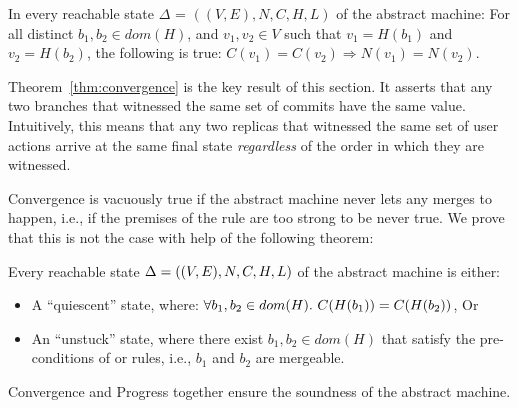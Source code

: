 \begin{theorem}[{\bf Convergence}]
  \label{thm:convergence}
  In every reachable state $\Delta$ = $((V,E),N,C,H,L)$ of the abstract
  machine: For all distinct $b_1, b_2 \in dom(H)$, and $v_1, v_2 \in V$
  such that $v_1 = H(b_1)$ and $v_2 = H(b_2)$, the following is true:
  $C(v_1) = C(v_2) \Rightarrow N(v_1) = N(v_2)$.
\end{theorem}

Theorem~\ref{thm:convergence} is the key result of this section. It
asserts that any two branches that witnessed the same set of commits
have the same value. Intuitively, this means that any two replicas
that witnessed the same set of user actions arrive at the same final
state \emph{regardless} of the order in which they are witnessed. 

Convergence is vacuously true if the abstract machine never lets any
merges to happen, i.e., if the premises of the  rule
are too strong to be never true. We prove that this is not the case
with help of the following theorem:

\begin{theorem}[{\bf Progress}]
  \label{thm:progress}
  Every reachable state $\Delta = ((V,E),\\N,C,H,L)$ of the abstract
  machine is either: 
  \begin{itemize}
    \item A ``quiescent'' state, where: $\\\forall b_1,b_2 \in
      dom(H).~C(H(b_1)) = C(H(b_2))$, Or
    \item An ``unstuck'' state, where there exist $b_1,b_2 \in dom(H)$
      that satisfy the pre-conditions of  or
       rules, i.e., $b_1$ and $b_2$ are mergeable. 
  \end{itemize}
\end{theorem}

Convergence and Progress together ensure the soundness of the \quark
abstract machine. 


